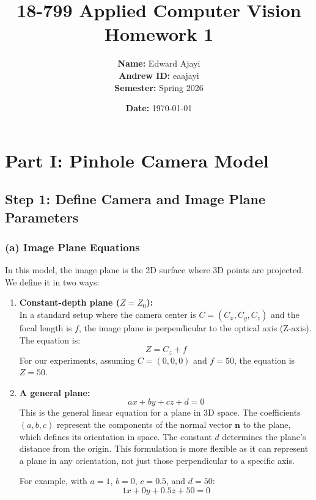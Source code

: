 \documentclass[12pt]{article}
\title{18-799 Applied Computer Vision \\ Homework 1}
\author{\textbf{Name:} Edward Ajayi \\ \textbf{Andrew ID:} eaajayi \\ \textbf{Semester:} Spring 2026}
\date{\textbf{Date:} \today}
\begin{document}
\maketitle
\newpage

\section*{Part I: Pinhole Camera Model}

\subsection*{Step 1: Define Camera and Image Plane Parameters}

\subsubsection*{(a) Image Plane Equations}

In this model, the image plane is the 2D surface where 3D points are projected. We define it in two ways:

\begin{enumerate}
    \item \textbf{Constant-depth plane ($Z = Z_0$):} \\
    In a standard setup where the camera center is $C = (C_x, C_y, C_z)$ and the focal length is $f$, the image plane is perpendicular to the optical axis (Z-axis). The equation is:
    \begin{equation}
        Z = C_z + f
    \end{equation}
    For our experiments, assuming $C = (0,0,0)$ and $f=50$, the equation is $Z = 50$.

    \item \textbf{A general plane:}
    \begin{equation}
        ax + by + cz + d = 0
    \end{equation}
    This is the general linear equation for a plane in 3D space. The coefficients $(a, b, c)$ represent the components of the normal vector $\mathbf{n}$ to the plane, which defines its orientation in space. The constant $d$ determines the plane's distance from the origin. This formulation is more flexible as it can represent a plane in any orientation, not just those perpendicular to a specific axis.
    
    For example, with $a=1$, $b=0$, $c=0.5$, and $d=50$:
    \begin{equation}
        1x + 0y + 0.5z + 50 = 0
    \end{equation}
\end{enumerate}
\end{document}
